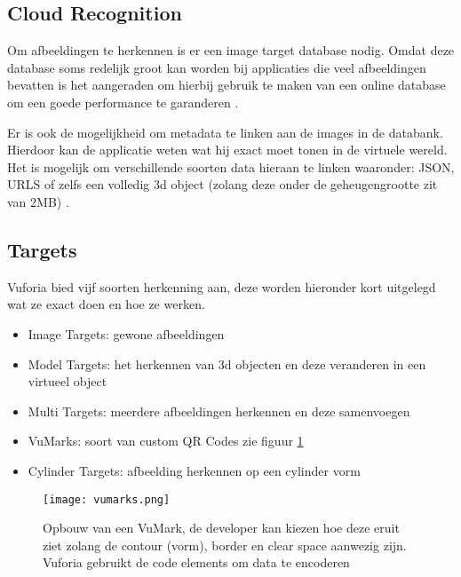 \subsection{Cloud Recognition}
Om afbeeldingen te herkennen is er een image target database nodig. Omdat deze database soms redelijk groot kan worden bij applicaties die veel afbeeldingen bevatten is het aangeraden om hierbij gebruik te maken van een online database om een goede performance te garanderen \autocite{VuforiaCloudReco}. 

Er is ook de mogelijkheid om metadata te linken aan de images in de databank. Hierdoor kan de applicatie weten wat hij exact moet tonen in de virtuele wereld. Het is mogelijk om verschillende soorten data hieraan te linken waaronder: JSON, URLS of zelfs een volledig 3d object (zolang deze onder de geheugengrootte zit van 2MB) \autocite{VuforiaCloudReco}.

\subsection{Targets}
Vuforia bied vijf soorten herkenning aan, deze worden hieronder kort uitgelegd wat ze exact doen en hoe ze werken.

\begin{itemize}
    \item Image Targets: gewone afbeeldingen
    \item Model Targets: het herkennen van 3d objecten en deze veranderen in een virtueel object
    \item Multi Targets: meerdere afbeeldingen herkennen en deze samenvoegen
    \item VuMarks: soort van custom QR Codes zie figuur \ref{fig:vumarks}
    \item Cylinder Targets: afbeelding herkennen op een cylinder vorm
\end{itemize} 

\begin{figure}
    \texttt{[image: vumarks.png]}
    \caption{Opbouw van een VuMark, de developer kan kiezen hoe deze eruit ziet zolang de contour (vorm), border en clear space aanwezig zijn. Vuforia gebruikt de code elements om data te encoderen \autocite{VuforiaMark}}
    \label{fig:vumarks}
\end{figure}


